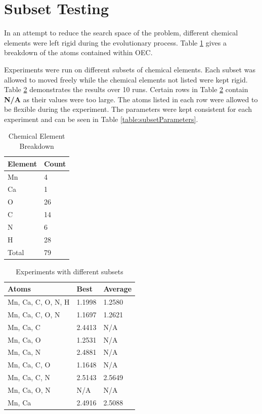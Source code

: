 \documentclass[conference]{IEEEtran}
\begin{document}
\section{Subset Testing}

In an attempt to reduce the search space of the problem, different chemical elements were left rigid during the evolutionary process. Table \ref{table:elementBreakdown} gives a breakdown of the atoms contained within OEC.

Experiments were run on different subsets of chemical elements. Each subset was allowed to moved freely while the chemical elements not listed were kept rigid. Table \ref{table:subsetResults} demonstrates the results over 10 runs. Certain rows in Table \ref{table:subsetResults} contain \textbf{N/A} as their values were too large. The atoms listed in each row were allowed to be flexible during the experiment. The parameters were kept consistent for each experiment and can be seen in Table \ref{table:subsetParameters}.

\begin{table}
\caption{Chemical Element Breakdown}
\label{table:elementBreakdown}
\centering
\normalsize
\begin{tabular}{ | l | l | }
  \hline
    Element & Count \\ \hline
    Mn & 4 \\ \hline
    Ca & 1 \\ \hline
    O & 26 \\ \hline
    C & 14 \\ \hline
    N & 6 \\ \hline
    H & 28 \\ \hline
    Total & 79 \\ \hline
\end{tabular}
\end{table}

\begin{table}
  \caption{Experiments with different subsets}
  \label{table:subsetResults}
  \centering
  \normalsize
  \begin{tabular}{ | l | l | l | }
    \hline
    Atoms & Best & Average \\ \hline \hline
    Mn, Ca, C, O, N, H & 1.1998 & 1.2580 \\ \hline
    Mn, Ca, C, O, N & 1.1697 & 1.2621 \\ \hline
    Mn, Ca, C & 2.4413 & N/A \\ \hline
    Mn, Ca, O & 1.2531 & N/A \\ \hline
    Mn, Ca, N & 2.4881 & N/A \\ \hline
    Mn, Ca, C, O & 1.1648 & N/A \\ \hline
    Mn, Ca, C, N & 2.5143 & 2.5649 \\ \hline
    Mn, Ca, O, N & N/A & N/A \\ \hline
    Mn, Ca & 2.4916 & 2.5088 \\ \hline
  \end{tabular}
\end{table}
\end{document}

